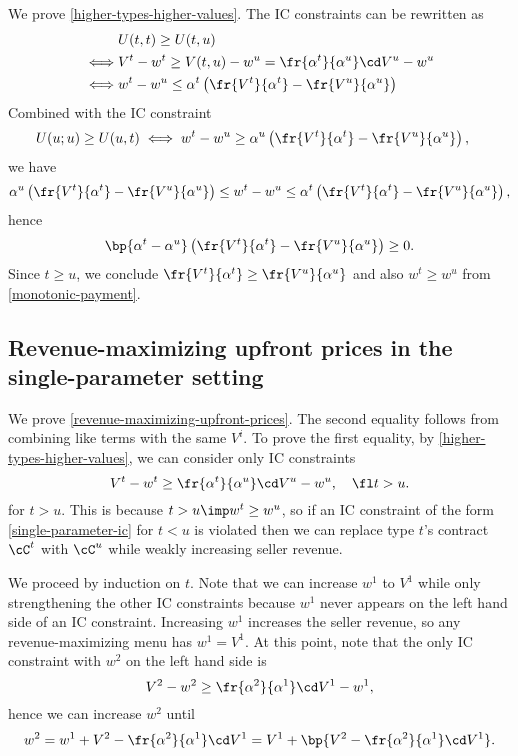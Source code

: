 We prove \cref{higher-types-higher-values}. The IC constraints can be rewritten as
    \begin{align*}
        & U(t,t) \geq U(t,u) \\
        \iff & V^t - w^t \ge V(t,u) - w^u  = \fr{\alpha^t}{\alpha^u} \cd V^u - w^u \\
        \iff & w^t  - w^u \le \alpha^t \left( \fr{V^t}{\alpha^t} - \fr{V^u}{\alpha^u} \right)
    \end{align*}
    Combined with the IC constraint
    \begin{align*}
        & U(u;u) \ge U(u,t) 
        \iff  w^t  - w^u \geq \alpha^u \left( \fr{V^t}{\alpha^t} - \fr{V^u}{\alpha^u} \right),
    \end{align*}
    we have
    \begin{align}\label{monotonic-payment}
        \alpha^u \left( \fr{V^t}{\alpha^t} - \fr{V^u}{\alpha^u} \right) \leq w^t - w^u \leq \alpha^t \left( \fr{V^t}{\alpha^t} - \fr{V^u}{\alpha^u} \right),
    \end{align}
    hence
    \begin{align*}
        \bp{\alpha^t - \alpha^u} \left(\fr{V^t}{\alpha^t} - \fr{V^u}{\alpha^u}\right) \geq 0.
    \end{align*}
    Since $t\ge u$, we conclude $\fr{V^t}{\alpha^t} \geq \fr{V^u}{\alpha^u}$ and also $w^t \geq w^u$ from \cref{monotonic-payment}.

\subsection{Revenue-maximizing upfront prices in the single-parameter setting} \label{revenue-maximizing-upfront-prices-proof}

We prove \cref{revenue-maximizing-upfront-prices}. The second equality follows from combining like terms with the same $V^i$. To prove the first equality, by \cref{higher-types-higher-values}, we can consider only IC constraints
\begin{equation} \label{single-parameter-ic}
    V^{t} - w^{t} \ge \fr{\alpha^{t}}{\alpha^{u}} \cd V^{u} - w^{u},\quad \fl t>u.
\end{equation}
for $t>u$. This is because $t>u\imp w^t \ge w^u$, so if an IC constraint of the form \cref{single-parameter-ic} for $t<u$ is violated then we can replace type $t$'s contract $\cC^t$ with $\cC^u$ while weakly increasing seller revenue.

We proceed by induction on $t$. Note that we can increase $w^1$ to $V^1$ while only strengthening the other IC constraints because $w^1$ never appears on the left hand side of an IC constraint. Increasing $w^1$ increases the seller revenue, so any revenue-maximizing menu has $w^1 = V^1$. At this point, note that the only IC constraint with $w^2$ on the left hand side is $$V^2 - w^2 \ge \fr{\alpha^2}{\alpha^1} \cd V^1 - w^1,$$ hence we can increase $w^2$ until $$w^2 = w^1 + V^2 - \fr{\alpha^2}{\alpha^1} \cd V^1 = V^1 + \bp{V^2 - \fr{\alpha^2}{\alpha^1} \cd V^1}.$$

